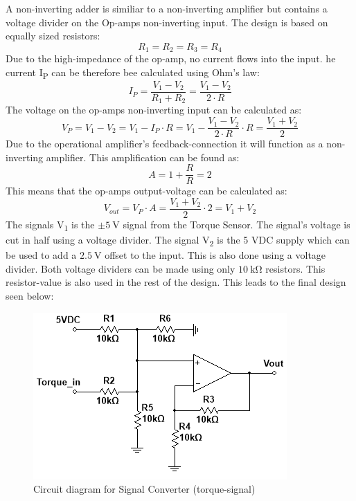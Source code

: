 A non-inverting adder is similiar to a non-inverting amplifier but contains a voltage divider on the Op-amps non-inverting input. The design is based on equally sized resistors:
\begin{equation}
	R_1 = R_2 = R_3 = R_4
\end{equation}
Due to the high-impedance of the op-amp, no current flows into the input. he current I\textsubscript{P} can be therefore bee calculated using Ohm's law:
\begin{equation}
	I_P = \frac{V_1 - V_2}{R_1 + R_2} = \frac{V_1 - V_2}{2 \cdot R}
\end{equation}
The voltage on the op-amps non-inverting input can be calculated as:
\begin{equation}
	V_P = V_1 - V_2 = V_1 - I_P \cdot R = V_1 - \frac{V_1 - V_2}{2 \cdot R} \cdot R = \frac{V_1 + V_2}{2}
\end{equation}
\newpage
Due to the operational amplifier's feedback-connection it will function as a non-inverting amplifier. This amplification can be found as:
\begin{equation}
	A = 1 + \frac{R}{R} = 2
\end{equation}
This means that the op-amps output-voltage can be calculated as:
\begin{equation}
	V_{out} = V_P \cdot A = \frac{V_1 + V_2}{2} \cdot 2 = V_1 + V_2
\end{equation}
The signals V\textsubscript{1} is the $\pm \SI{5}{\volt}$ signal from the Torque Sensor. The signal's voltage is cut in half using a voltage divider. The signal V\textsubscript{2} is the 5 VDC supply which can be used to add a $\SI{2.5}{\volt}$ offset to the input. This is also done using a voltage divider. Both voltage dividers can be made using only $\SI{10}{\kilo \ohm}$ resistors. This resistor-value is also used in the rest of the design. This leads to the final design seen below:

\begin{figure}[H]
	\centering
	\includegraphics[width=0.5\linewidth]{Hardware/SignalConverter/TorqueDesign2}
	\caption{Circuit diagram for Signal Converter (torque-signal)}
	\label{fig:SignalConverterTorque2}
\end{figure}